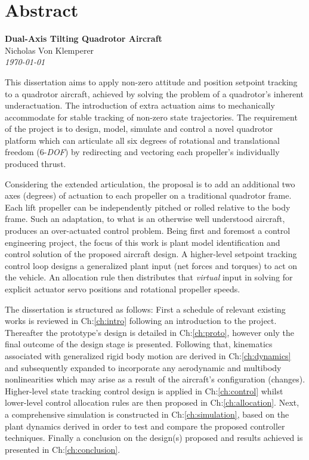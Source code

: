 \documentclass[a4paper, 11pt, oneside, openright, parskip=full]{book}
\newcommand{\auth}{Nicholas Von Klemperer}								%
\newcommand{\titl}{Dual-Axis Tilting Quadrotor Aircraft}						%
\begin{document}
\chapter{Abstract}				
\label{ch:abs}
\begin{center}
	\textbf{\Large \titl}\\
			\vskip 0.2cm
			\auth\\
			\vskip 0.2cm
	\textit{\footnotesize\today}
			\vskip 1cm
\end{center}
This dissertation aims to apply non-zero attitude and position setpoint tracking to a quadrotor aircraft, achieved by solving the problem of a quadrotor's inherent underactuation. The introduction of extra actuation aims to mechanically accommodate for stable tracking of non-zero state trajectories. The requirement of the project is to design, model, simulate and control a novel quadrotor platform which can articulate all six degrees of rotational and translational freedom (6-\emph{DOF}) by redirecting and vectoring each propeller's individually produced thrust. 
\par
Considering the extended articulation, the proposal is to add an additional two axes (degrees) of actuation to each propeller on a traditional quadrotor frame. Each lift propeller can be independently pitched or rolled relative to the body frame. Such an adaptation, to what is an otherwise well understood aircraft, produces an over-actuated control problem. Being first and foremost a control engineering project, the focus of this work is plant model identification and control solution of the proposed aircraft design. A higher-level setpoint tracking control loop designs a generalized plant input (net forces and torques) to act on the vehicle. An allocation rule then distributes that \emph{virtual} input in solving for explicit actuator servo positions and rotational propeller speeds.
\par
The dissertation is structured as follows: First a schedule of relevant existing works is reviewed in Ch:\ref{ch:intro} following an introduction to the project. Thereafter the prototype's design is detailed in Ch:\ref{ch:proto}, however only the final outcome of the design stage is presented. Following that, kinematics associated with generalized rigid body motion are derived in Ch:\ref{ch:dynamics} and subsequently expanded to incorporate any aerodynamic and multibody nonlinearities which may arise as a result of the aircraft's configuration (changes). Higher-level state tracking control design is applied in Ch:\ref{ch:control} whilst lower-level control allocation rules are then proposed in Ch:\ref{ch:allocation}. Next, a comprehensive simulation is constructed in Ch:\ref{ch:simulation}, based on the plant dynamics derived in order to test and compare the proposed controller techniques. Finally a conclusion on the design(s) proposed and results achieved is presented in Ch:\ref{ch:conclusion}.
\end{document}
